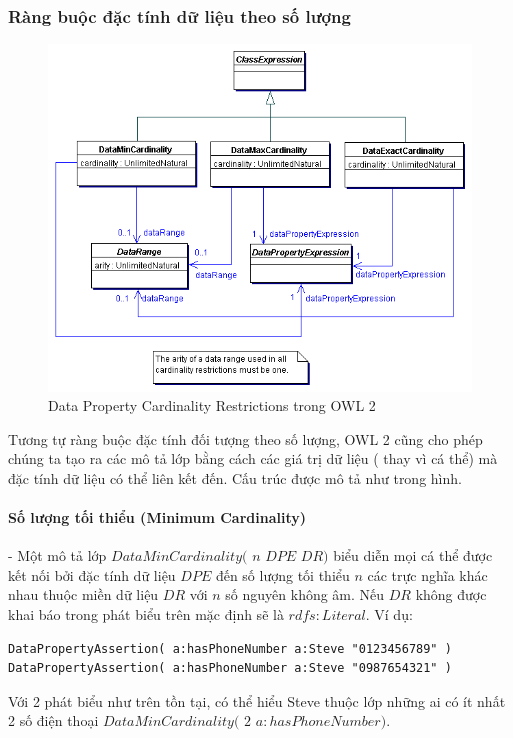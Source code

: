 \subsubsection{Ràng buộc đặc tính dữ liệu theo số lượng}
\begin{figure}[h]
	\centering
	\includegraphics[width=120mm]{Figures/ce_4.png}
	\caption{Data Property Cardinality Restrictions trong OWL 2\label{overflow}}
\end{figure}
Tương tự ràng buộc đặc tính đối tượng theo số lượng, OWL 2 cũng cho phép chúng ta tạo ra các mô tả lớp bằng cách các giá trị dữ liệu ( thay vì cá thể) mà đặc tính dữ liệu có thể liên kết đến. Cấu trúc được mô tả như trong hình.
\paragraph{Số lượng tối thiểu (Minimum Cardinality)} - Một mô tả lớp $DataMinCardinality($ $n$ $DPE$ $DR)$  biểu diễn mọi cá thể được kết nối bởi đặc tính dữ liệu $DPE$ đến số lượng tối thiểu $n$ các trực nghĩa khác nhau thuộc miền dữ liệu  $DR$ với $n$ số nguyên không âm. Nếu $DR$ không được khai báo trong phát biểu trên mặc định sẽ là $rdfs:Literal$. Ví dụ:
\begin{verbatim}
DataPropertyAssertion( a:hasPhoneNumber a:Steve "0123456789" )
DataPropertyAssertion( a:hasPhoneNumber a:Steve "0987654321" )
\end{verbatim}
Với 2 phát biểu như trên tồn tại, có thể hiểu Steve thuộc lớp những ai có ít nhất 2 số điện thoại $DataMinCardinality($ $2$ $a:hasPhoneNumber)$.

